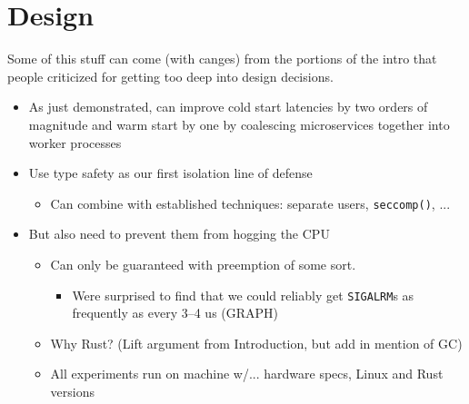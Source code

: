 \section{Design}
\label{sec:design}

Some of this stuff can come (with canges) from the portions of the intro that people criticized for getting too deep into design decisions.

\begin{itemize}
\item As just demonstrated, can improve cold start latencies by two orders of magnitude and warm start by one by coalescing microservices together into worker processes
\item Use type safety as our first isolation line of defense
\begin{itemize}
\item Can combine with established techniques: separate users, \texttt{seccomp()}, ...
\end{itemize}
\item But also need to prevent them from hogging the CPU
\begin{itemize}
\item Can only be guaranteed with preemption of some sort.
\begin{itemize}
\item Were surprised to find that we could reliably get \texttt{SIGALRM}s as frequently as every 3--4 us (GRAPH)
\end{itemize}
\item Why Rust? (Lift argument from Introduction, but add in mention of GC)
\item All experiments run on machine w/... hardware specs, Linux and Rust versions
\end{itemize}

\end{itemize}
